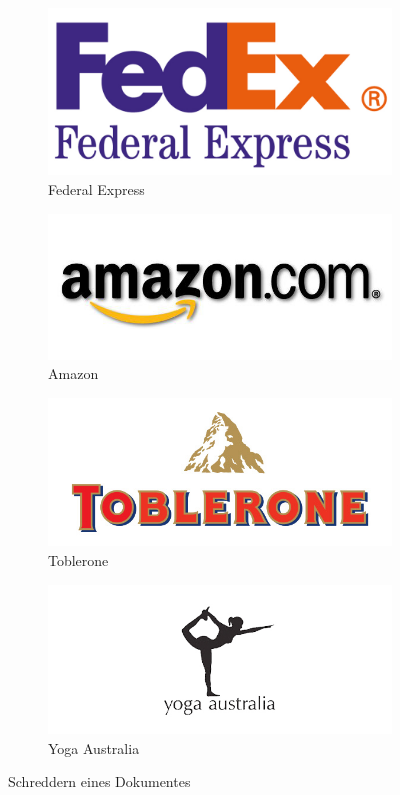 \begin{figure}[htb]
	\begin{subfigure}[b]{.45\linewidth}
		\centering
		\includegraphics[width=0.8\linewidth]{images/framing-fedex.jpg}
		\caption{Federal Express}
		\label{fig:socialengineering:weiteretechniken:framing:fedex}
	\end{subfigure}%
	\begin{subfigure}[b]{.45\linewidth}
	  \centering
	  \includegraphics[width=0.8\linewidth]{images/framing-amazon.jpg}
	  \caption{Amazon}
	  \label{fig:socialengineering:weiteretechniken:framing:amazon}
	\end{subfigure}
	\begin{subfigure}[b]{.45\linewidth}
		\centering
		\includegraphics[width=0.8\linewidth]{images/framing-toblerone.jpg}
		\caption{Toblerone}
		\label{fig:socialengineering:weiteretechniken:framing:toblerone}
	\end{subfigure}
	\begin{subfigure}[b]{.45\linewidth}
		\centering
		\includegraphics[width=0.8\linewidth]{images/framing-yoga.jpg}
		\caption{Yoga Australia}
		\label{fig:socialengineering:weiteretechniken:framing:yoga}
	\end{subfigure}
  \caption{Schreddern eines Dokumentes}
  \label{fig:socialengineering:weiteretechniken:framing}
\end{figure}
